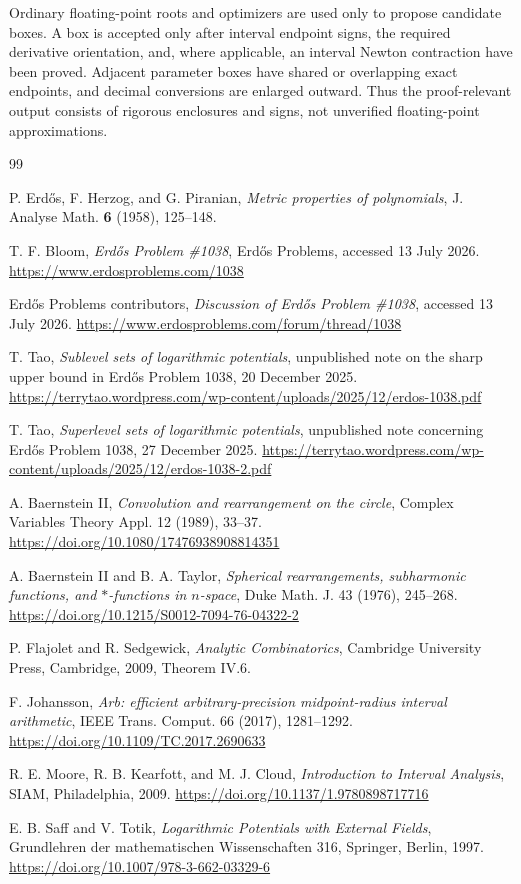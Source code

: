 \documentclass[11pt]{article}
\numberwithin{equation}{section}
\theoremstyle{plain}
\theoremstyle{definition}
\theoremstyle{remark}
\newcommand{\1}{\mathbf 1}
\begin{document}
Ordinary floating-point roots and optimizers are used only to propose
candidate boxes.  A box is accepted only after interval endpoint signs,
the required derivative orientation, and, where applicable, an interval
Newton contraction have been proved.  Adjacent parameter boxes have shared
or overlapping exact endpoints, and decimal conversions are enlarged
outward.  Thus the proof-relevant output consists of rigorous enclosures and
signs, not unverified floating-point approximations.

\begin{thebibliography}{99}

P. Erd\H{o}s, F. Herzog, and G. Piranian,
\emph{Metric properties of polynomials},
J. Analyse Math. \textbf{6} (1958), 125--148.

T. F. Bloom,
\emph{Erd\H{o}s Problem \#1038},
Erd\H{o}s Problems, accessed 13 July 2026.
\url{https://www.erdosproblems.com/1038}

Erd\H{o}s Problems contributors,
\emph{Discussion of Erd\H{o}s Problem \#1038},
accessed 13 July 2026.
\url{https://www.erdosproblems.com/forum/thread/1038}

T. Tao,
\emph{Sublevel sets of logarithmic potentials},
unpublished note on the sharp upper bound in Erd\H{o}s Problem 1038,
20 December 2025.
\url{https://terrytao.wordpress.com/wp-content/uploads/2025/12/erdos-1038.pdf}

T. Tao,
\emph{Superlevel sets of logarithmic potentials},
unpublished note concerning Erd\H{o}s Problem 1038,
27 December 2025.
\url{https://terrytao.wordpress.com/wp-content/uploads/2025/12/erdos-1038-2.pdf}

A. Baernstein II,
\emph{Convolution and rearrangement on the circle}, Complex Variables
Theory Appl. 12 (1989), 33--37.
\url{https://doi.org/10.1080/17476938908814351}

A. Baernstein II and B. A. Taylor,
\emph{Spherical rearrangements, subharmonic functions, and
$*$-functions in $n$-space}, Duke Math. J. 43 (1976), 245--268.
\url{https://doi.org/10.1215/S0012-7094-76-04322-2}

P. Flajolet and R. Sedgewick,
\emph{Analytic Combinatorics}, Cambridge University Press, Cambridge,
2009, Theorem IV.6.

F. Johansson,
\emph{Arb: efficient arbitrary-precision midpoint-radius interval
arithmetic}, IEEE Trans. Comput. 66 (2017), 1281--1292.
\url{https://doi.org/10.1109/TC.2017.2690633}

R. E. Moore, R. B. Kearfott, and M. J. Cloud,
\emph{Introduction to Interval Analysis}, SIAM, Philadelphia, 2009.
\url{https://doi.org/10.1137/1.9780898717716}

E. B. Saff and V. Totik,
\emph{Logarithmic Potentials with External Fields}, Grundlehren der
mathematischen Wissenschaften 316, Springer, Berlin, 1997.
\url{https://doi.org/10.1007/978-3-662-03329-6}

\end{thebibliography}
\end{document}
